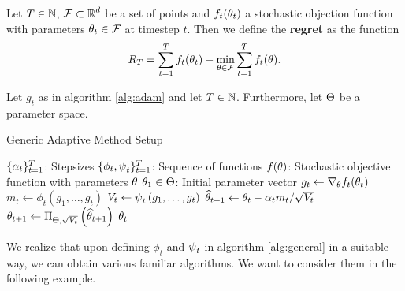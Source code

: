 \begin{definition}\label{def:regret}
Let $T\in \operatorname{\mathbb{N}}$, $\operatorname{\mathcal{F}}\subset\operatorname{\mathbb{R}}^d$ be a set of points and $f_t(\theta_t)$ a stochastic objection function with parameters $\theta_t\in\operatorname{\mathcal{F}}$ at timestep $t$. Then we define the \textbf{regret} as the function
\begin{align*}
R_T = \sum_{t=1}^Tf_t(\theta_t) - \min_{\theta \in\operatorname{\mathcal{F}}} \sum_{t=1}^Tf_t(\theta).
\end{align*}
\end{definition}

\begin{algorithm}[H]
Let $g_t$ as in algorithm \ref{alg:adam} and let $T\in\operatorname{\mathbb{N}}$. Furthermore, let $\operatorname{\Theta}$ be a parameter space.
\caption{Generic Adaptive Method Setup}\label{alg:general}
\begin{algorithmic}[1]
\Require $\{\alpha_t\}_{t=1}^T$: Stepsizes
\Require $\{\phi_t, \operatorname{\psi}_t\}_{t=1}^T$: Sequence of functions
\Require $f(\theta)$: Stochastic objective function with parameters $\theta$
\Require $\theta_1\in\operatorname{\Theta}$: Initial parameter vector
	\State $g_t \gets \nabla_{\theta}f_t(\theta_{t})$ 
	\State $m_t \gets \phi_t\left(g_1,\ldots,g_t \right)$ 
	\State $V_t \gets \operatorname{\psi}_t\left(g_1,\ldots,g_t\right)$ 
	\State $\widehat{\theta}_{t+1} \gets \theta_t - \alpha_t m_t/\sqrt{V_t}$ 
	\State $\theta_{t+1} \gets \Pi_{\operatorname{\Theta},\sqrt{V_t}}\left(\widehat{\theta}_{t+1} \right)$ 
\EndFor
\State \Return $\theta_{t}$ 
\end{algorithmic}
\end{algorithm}

We realize that upon defining $\phi_t$ and $\operatorname{\psi}_t$ in algorithm \ref{alg:general} in a suitable way, we can obtain various familiar algorithms. We want to consider them in the following example.

